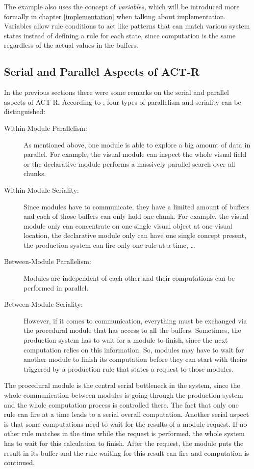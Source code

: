 The example also uses the concept of \emph{variables}, which will be introduced more formally in chapter \ref{implementation} when talking about implementation. Variables allow rule conditions to act like patterns that can match various system states instead of defining a rule for each state, since computation is the same regardless of the actual values in the buffers.

\subsection{Serial and Parallel Aspects of ACT-R}
\label{serial_parallel_aspects}

In the previous sections there were some remarks on the serial and parallel aspects of ACT-R. According to \cite[p. 68]{anderson_how_2007}, four types of parallelism and seriality can be distinguished:

\begin{description}
 \item[Within-Module Parallelism:] As mentioned above, one module is able to explore a big amount of data in parallel. For example, the visual module can inspect the whole visual field or the declarative module performs a massively parallel search over all chunks.
 \item[Within-Module Seriality:] Since modules have to communicate, they have a limited amount of buffers and each of those buffers can only hold one chunk. For example, the visual module only can concentrate on one single visual object at one visual location, the declarative module only can have one single concept present, the production system can fire only one rule at a time, \dots 
 \item[Between-Module Parallelism:] Modules are independent of each other and their computations can be performed in parallel.
 \item[Between-Module Seriality:] However, if it comes to communication, everything must be exchanged via the procedural module that has access to all the buffers. Sometimes, the production system has to wait for a module to finish, since the next computation relies on this information. So, modules may have to wait for another module to finish its computation before they can start with theirs triggered by a production rule that states a request to those modules.
\end{description}

The procedural module is the central serial bottleneck in the system, since the whole communication between modules is going through the production system and the whole computation process is controlled there. The fact that only one rule can fire at a time leads to a serial overall computation. Another serial aspect is that some computations need to wait for the results of a module request. If no other rule matches in the time while the request is performed, the whole system has to wait for this calculation to finish. After the request, the module puts the result in its buffer and the rule waiting for this result can fire and computation is continued.

